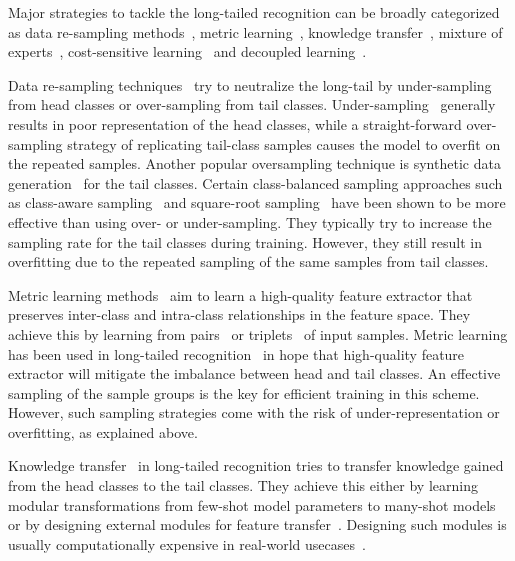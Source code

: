 \documentclass[10pt,twocolumn,letterpaper]{article}
\newcommand{\sinha}[1]{{\color{black}#1}}
\begin{document}
Major strategies to tackle the long-tailed recognition can be broadly categorized as 
\sinha{data re-sampling methods~\cite{smote,borderline-smote,classbalancedsampling_1,oversampling_1,undersampling_1,sinha_ijcv}}, 
metric learning~\cite{tripletloss,contrastivelearning,liftedloss,m-sloss},
knowledge transfer~\cite{oltr,kt_1,kt_2}, 
mixture of experts~\cite{RIDE,LFME,TADE}, 
\sinha{cost-sensitive learning~\cite{ldam-drw,classbalancedloss,logitadjustment,meta-weight-net,sinha_ijcv}} and decoupled learning~\cite{decoupling,dro-lt,disalign,mislas}.


Data re-sampling techniques~\cite{smote,borderline-smote,classbalancedsampling_1,oversampling_1,undersampling_1} try to neutralize the long-tail by under-sampling from head classes or over-sampling from tail classes. 
Under-sampling~\cite{undersampling_1} generally results in poor representation of the head classes,
while a straight-forward over-sampling strategy of replicating tail-class samples causes the model to overfit on the repeated samples.
Another popular oversampling technique is synthetic data generation~\cite{smote,borderline-smote} for the tail classes. 
Certain class-balanced sampling approaches such as class-aware sampling~\cite{classbalancedsampling_1,decoupling,classbalancedsampling_2} and square-root sampling~\cite{decoupling} have been shown to be more effective than using over- or under-sampling.
They typically try to increase the sampling rate for the tail classes during training. 
However, they still result in overfitting due to the repeated sampling of the same samples from tail classes.

Metric learning methods~\cite{hingeloss,tripletloss,contrastivelearning,liftedloss,m-sloss,rangeloss} aim to learn a high-quality feature extractor that preserves inter-class and intra-class relationships in the feature space. 
They achieve this by learning from pairs~\cite{contrastivelearning,liftedloss,rangeloss} or triplets~\cite{hingeloss,tripletloss} of input samples. 
Metric learning has been used in long-tailed recognition~\cite{oltr,hybridnet} in hope that high-quality feature extractor will mitigate the imbalance between head and tail classes. 
An effective sampling of the sample groups is the key for efficient training in this scheme. 
However, such sampling strategies come with the risk of under-representation or overfitting, as explained above.


Knowledge transfer~\cite{featuretransfer2,oltr,kt_1,kt_2,featuretransfer} in long-tailed recognition tries to transfer knowledge gained from the head classes to the tail classes. They achieve this either by learning modular transformations from few-shot model parameters to many-shot models~\cite{kt_1,kt_2} or by designing external modules for feature transfer~\cite{oltr,featuretransfer}.
Designing such modules is usually computationally expensive in real-world usecases~\cite{decoupling}.
\end{document}
